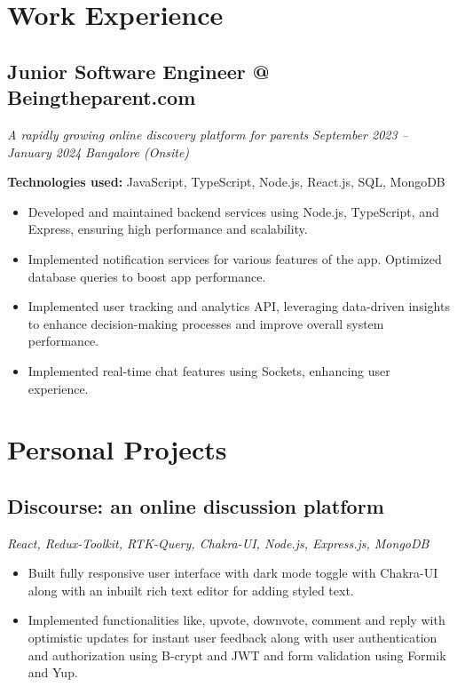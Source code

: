 \documentclass[a4paper]{article}
\begin{document}
\section{Work Experience}
\subsection{Junior Software Engineer @ Beingtheparent.com}
\textit{A rapidly growing online discovery platform for parents}
\hfill
\textit{September 2023 -- January 2024}
\textbar
\textit{ Bangalore (Onsite)}

\vspace{3pt}
\textbf{Technologies used:}
JavaScript, TypeScript, Node.js, React.js, SQL, MongoDB
\begin{itemize}
	\item Developed and maintained backend services using Node.js, TypeScript, and Express, ensuring high performance and scalability.
	\item Implemented notification services for various features of the app. Optimized database queries to boost app performance.
	\item Implemented user tracking and analytics API, leveraging data-driven insights to enhance decision-making processes and improve overall system performance.
	\item Implemented real-time chat features using Sockets, enhancing user experience.
\end{itemize}
\section{Personal Projects}
\subsection{Discourse: an online discussion platform}
\textit{React, Redux-Toolkit, RTK-Query, Chakra-UI, Node.js, Express.js, MongoDB}
\hfill
\href{https://discourse-app.netlify.app/}{ \faLink }
\textbar
\href{https://github.com/jatinkumar-me/Discourse}{ \faCode}
\begin{itemize}
	\item Built fully responsive user interface with dark mode toggle with Chakra-UI along with an inbuilt rich text editor for adding styled text.
	\item Implemented functionalities like, upvote, downvote, comment and reply with optimistic updates for instant user feedback along with user authentication and authorization using B-crypt and JWT and form validation using Formik and Yup.
\end{itemize}
\end{document}

